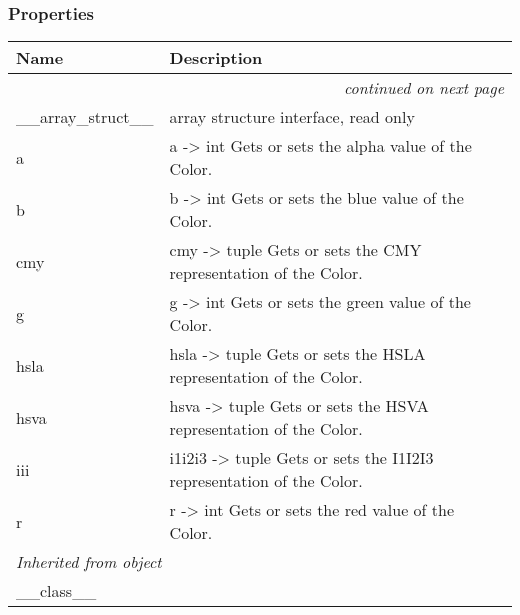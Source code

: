 
  \subsubsection{Properties}

    \vspace{-1cm}
\hspace{\varindent}\begin{longtable}{|p{\varnamewidth}|p{\vardescrwidth}|l}
\cline{1-2}
\cline{1-2} \centering \textbf{Name} & \centering \textbf{Description}& \\
\cline{1-2}
\endhead\cline{1-2}\multicolumn{3}{r}{\small\textit{continued on next page}}\\\endfoot\cline{1-2}
\endlastfoot\raggedright \_\-\_\-a\-r\-r\-a\-y\-\_\-s\-t\-r\-u\-c\-t\-\_\-\_\- & \raggedright array structure interface, read only&\\
\cline{1-2}
\raggedright a\- & \raggedright a -{\textgreater} int Gets or sets the alpha value of the Color.&\\
\cline{1-2}
\raggedright b\- & \raggedright b -{\textgreater} int Gets or sets the blue value of the Color.&\\
\cline{1-2}
\raggedright c\-m\-y\- & \raggedright cmy -{\textgreater} tuple Gets or sets the CMY representation of 
          the Color.&\\
\cline{1-2}
\raggedright g\- & \raggedright g -{\textgreater} int Gets or sets the green value of the Color.&\\
\cline{1-2}
\raggedright h\-s\-l\-a\- & \raggedright hsla -{\textgreater} tuple Gets or sets the HSLA representation 
          of the Color.&\\
\cline{1-2}
\raggedright h\-s\-v\-a\- & \raggedright hsva -{\textgreater} tuple Gets or sets the HSVA representation 
          of the Color.&\\
\cline{1-2}
\raggedright i\-1\-i\-2\-i\-3\- & \raggedright i1i2i3 -{\textgreater} tuple Gets or sets the I1I2I3 
          representation of the Color.&\\
\cline{1-2}
\raggedright r\- & \raggedright r -{\textgreater} int Gets or sets the red value of the Color.&\\
\cline{1-2}
\multicolumn{2}{|l|}{\textit{Inherited from object}}\\
\multicolumn{2}{|p{\varwidth}|}{\raggedright \_\_class\_\_}\\
\cline{1-2}
\end{longtable}

